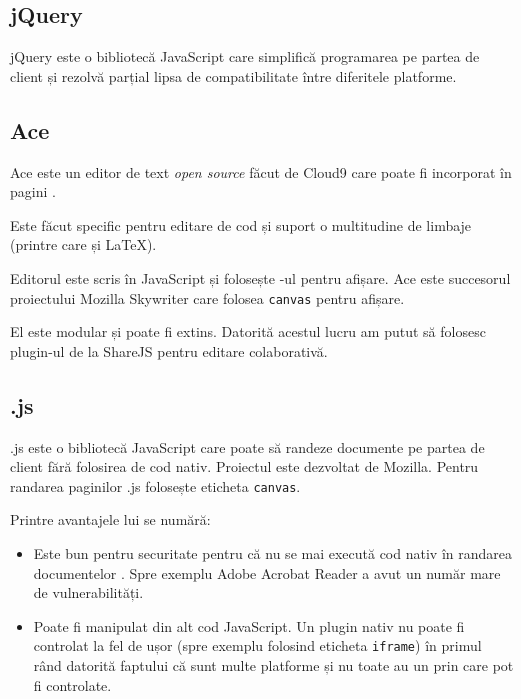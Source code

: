 \documentclass[a4wide,12pt]{report}
\newcommand{\eng}[1]{\emph{#1}} %
\newcommand{\cod}[1]{\texttt{#1}}
\newcommand{\acr}[1]{{\textsmaller[1]{\textsc{#1}}}} %
\begin{document}
\subsection{jQuery}

jQuery este o bibliotecă JavaScript care simplifică programarea pe partea de
client și rezolvă parțial lipsa de compatibilitate între diferitele platforme.

\subsection{Ace}
\label{acesub}

Ace\cite{ace} este un editor de text \eng{open source} făcut de Cloud9 care
poate fi incorporat în pagini \acr{HTML}.

Este făcut specific pentru editare de cod și suport o multitudine de limbaje
(printre care și \LaTeX{}).

Editorul este scris în JavaScript și folosește \acr{DOM}-ul pentru afișare. Ace
este succesorul proiectului Mozilla Skywriter care folosea \cod{canvas} pentru
afișare.

El este modular și poate fi extins. Datorită acestul lucru am putut să folosesc
plugin-ul de la ShareJS pentru editare colaborativă.

\subsection{\acr{PDF}.js}

\acr{PDF}.js\cite{pdfjs} este o bibliotecă JavaScript care poate să randeze documente
\acr{PDF} pe partea de client fără folosirea de cod nativ. Proiectul este
dezvoltat de Mozilla. Pentru randarea paginilor \acr{PDF}.js folosește eticheta
\cod{canvas}.

Printre avantajele lui se numără:

\begin{itemize}

\item Este bun pentru securitate pentru că nu se mai execută cod nativ în
randarea documentelor \acr{PDF}. Spre exemplu Adobe Acrobat Reader a avut un
număr mare de vulnerabilități.

\item Poate fi manipulat din alt cod JavaScript. Un plugin nativ nu poate fi
controlat la fel de ușor (spre exemplu folosind eticheta \cod{iframe}) în primul
rând datorită faptului că sunt multe platforme și nu toate au un \acr{API} prin
care pot fi controlate.

\end{itemize}
\end{document}
